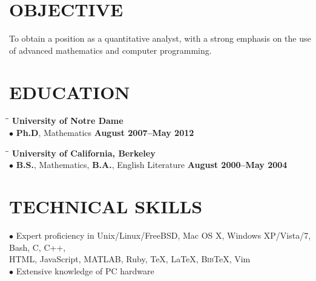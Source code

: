 \documentclass{resume}
\begin{document}
\begin{resume}

  \section{OBJECTIVE}  \vspace{0.05in}
  To obtain a position as a quantitative analyst, with a strong emphasis on the use of advanced mathematics and computer programming. 

	\section{EDUCATION}  \vspace{0.05in}
	\begin{tabbing}
\hspace{2.3in}\= \hspace{2.6in}\= \kill
\textbf{University of Notre Dame} \\
$\bullet$ \textbf{Ph.D}, Mathematics \>\>\textbf{August 2007--May 2012}
\\ 
      \end{tabbing}	
	\vspace{-0.5in} 
	\begin{tabbing}
\hspace{2.3in}\= \hspace{2.6in}\= \kill
\textbf{University of California, Berkeley}
\\
$\bullet$ \textbf{B.S.}, Mathematics, \textbf{B.A.}, English Literature \>\>\textbf{August 2000--May 2004}
\end{tabbing}

\section{TECHNICAL SKILLS} \vspace{0.05in}
	$\bullet$ Expert proficiency in 
	Unix/Linux/FreeBSD, Mac OS X, Windows XP/Vista/7, Bash, C, C++, \\
	\phantom{$\bullet$} HTML, 
JavaScript, MATLAB, Ruby, \TeX{}, \LaTeX{}, B\textsc{ib}\TeX{}, Vim\\
	$\bullet$ Extensive knowledge of PC hardware 

\end{resume}
\end{document}
